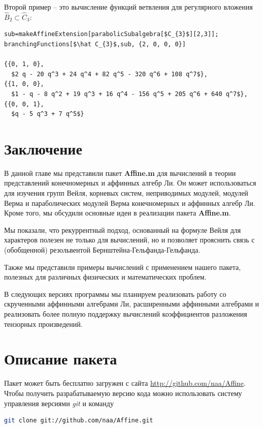 Второй пример -- это вычисление функций ветвления для регулярного вложения  $\hat B_{2}\subset \hat C_{3}$:
\begin{lstlisting}[mathescape=true]
sub=makeAffineExtension[parabolicSubalgebra[$C_{3}$][2,3]];
branchingFunctions[$\hat C_{3}$,sub, {2, 0, 0, 0}]

{{0, 1, 0}, 
  $2 q - 20 q^3 + 24 q^4 + 82 q^5 - 320 q^6 + 108 q^7$}, 
{{1, 0, 0}, 
  $1 - q - 8 q^2 + 19 q^3 + 16 q^4 - 156 q^5 + 205 q^6 + 640 q^7$}, 
{{0, 0, 1}, 
  $q - 5 q^3 + 7 q^5$}
\end{lstlisting}

\section{Заключение}
\label{sec:conclusion}
В данной главе мы представили пакет {\bf Affine.m} для вычислений в теории представлений конечномерных и аффинных алгебр Ли. Он может использоваться для изучения групп Вейля, корневых систем, неприводимых модулей, модулей Верма и параболических модулей Верма конечномерных и аффинных алгебр Ли. Кроме того, мы обсудили основные идеи в реализации пакета  {\bf Affine.m}. 

Мы показали, что рекуррентный подход, основанный на формуле Вейля для характеров полезен не только для вычислений, но и позволяет прояснить связь с (обобщенной) резольвентой Бернштейна-Гельфанда-Гельфанда.

Также мы представили примеры вычислений с применением нашего пакета, полезных для различных физических и математических проблем. 

В следующих версиях программы мы планируем реализовать работу со скрученными аффинными алгебрами Ли, расширенными аффинными алгебрами и реализовать более полную поддержку вычислений коэффициентов разложения тензорных произведений.

\appendix

\section{Описание пакета}
\label{package}
Пакет может быть бесплатно загружен с сайта \url{http://github.com/naa/Affine}. Чтобы получить разрабатываемую версию кода можно использовать систему управления версиями {\it git} и команду
\begin{lstlisting}[language=bash]
 git clone git://github.com/naa/Affine.git
\end{lstlisting}

